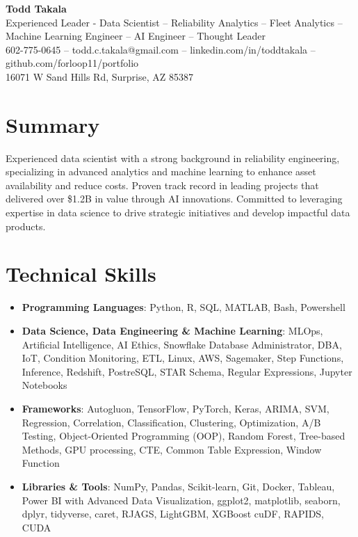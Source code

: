 \documentclass[letterpaper,10pt]{article}
\newcommand{\resumeItem}[1]{\item\small{#1}}
\newcommand{\resumeSubHeadingList}{\begin{itemize}[leftmargin=0.15in, label={}]}
\newcommand{\resumeSubHeadingListEnd}{\end{itemize}}
\begin{document}
\begin{center}
  \textbf{\Huge Todd Takala} \\
  \small Experienced Leader - Data Scientist -- Reliability Analytics -- Fleet Analytics -- Machine Learning Engineer -- AI Engineer -- Thought Leader \\
  \small 602-775-0645 -- todd.c.takala@gmail.com -- 
  linkedin.com/in/toddtakala --
  github.com/forloop11/portfolio \\
  \small 16071 W Sand Hills Rd, Surprise, AZ 85387
\end{center}

\section*{Summary}
Experienced data scientist with a strong background in reliability engineering, specializing in advanced analytics and machine learning to enhance asset availability and reduce costs. Proven track record in leading projects that delivered over \$1.2B in value through AI innovations. Committed to leveraging expertise in data science to drive strategic initiatives and develop impactful data products.

\section{Technical Skills}
    \resumeSubHeadingList
        
        \resumeItem{\textbf{Programming Languages}: Python, R, SQL, MATLAB, Bash, Powershell}
        
        \resumeItem{\textbf{Data Science, Data Engineering \& Machine Learning}: MLOps, Artificial Intelligence, AI Ethics, Snowflake Database Administrator, DBA, IoT, Condition Monitoring, ETL, Linux, AWS, Sagemaker, Step Functions, Inference, Redshift, PostreSQL, STAR Schema, Regular Expressions, Jupyter Notebooks}
        
        \resumeItem{\textbf{Frameworks}: Autogluon, TensorFlow, PyTorch, Keras, ARIMA, SVM, Regression, Correlation, Classification, Clustering, Optimization, A/B Testing, Object-Oriented Programming (OOP), Random Forest, Tree-based Methods, GPU processing, CTE, Common Table Expression, Window Function}
        
        \resumeItem{\textbf{Libraries \& Tools}: NumPy, Pandas, Scikit-learn, Git, Docker, Tableau, Power BI with Advanced Data Visualization, ggplot2, matplotlib, seaborn, dplyr, tidyverse, caret, RJAGS, LightGBM, XGBoost cuDF, RAPIDS, CUDA}
\resumeSubHeadingListEnd
\end{document}
